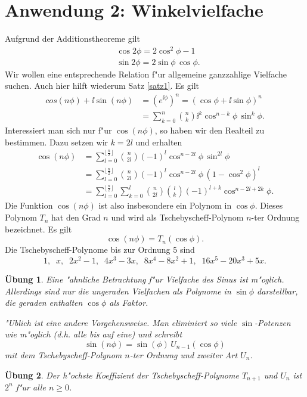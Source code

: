 \documentclass[11pt]{article}
\newtheorem{uebung}{\"{U}bung}
\begin{document}
\section{Anwendung 2: Winkelvielfache}
Aufgrund der Additionstheoreme gilt
\begin{align}
  &\cos 2\phi=2\cos^2\phi-1\\
  &\sin 2\phi=2\sin\phi\,\cos\phi.
\end{align}
Wir wollen eine entsprechende Relation f"ur allgemeine ganzzahlige Vielfache
suchen. Auch hier hilft wiederum Satz \ref{satz1}. Es gilt
\begin{align*}
  cos(n\phi)+\ii\sin(n\phi)
  &=\left(e^{\ii\phi}\right)^n=(\cos\phi+\ii\sin\phi)^n\\
  &=\sum_{k=0}^n\binom{n}{k} \ii^k \cos^{n-k}\phi\,\sin^k\phi.
\end{align*}   
Interessiert man sich nur f"ur $\cos(n\phi)$, so haben wir den Realteil zu
bestimmen. Dazu setzen wir $k=2l$ und erhalten
\begin{align*}
  \cos(n\phi)&=\sum_{l=0}^{\lfloor\frac n2\rfloor}
  \binom{n}{2l}(-1)^l\cos^{n-2l}\phi\,\sin^{2l}\phi\\
  &=\sum_{l=0}^{\lfloor\frac n2\rfloor}
  \binom{n}{2l}(-1)^l\cos^{n-2l}\phi\,(1-\cos^2\phi)^l\\
  &=\sum_{l=0}^{\lfloor\frac n2\rfloor}\sum_{k=0}^l
  \binom{n}{2l}\binom{l}{k}(-1)^{l+k}\cos^{n-2l+2k}\phi.
\end{align*}
Die Funktion $\cos(n\phi)$ ist also insbesondere ein Polynom in
$\cos\phi$. Dieses Polynom $T_n$ hat den Grad $n$ und wird als
Tschebyscheff-Polynom $n$-ter Ordnung bezeichnet. Es gilt
\begin{equation}
  \cos(n\phi)=T_n(\cos\phi).
\end{equation}
Die Tschebyscheff-Polynome bis zur Ordnung 5 sind
\begin{equation}
  1,\;\;x,\;\;2x^2-1,\;\;4x^3-3x,\;\;8x^4-8x^2+1,\;\;16x^5-20x^3+5x.
\end{equation}
\begin{uebung}
  Eine "ahnliche Betrachtung f"ur Vielfache des Sinus ist m"oglich. Allerdings
  sind nur die ungeraden Vielfachen als Polynome in $\sin\phi$ darstellbar, die
  geraden enthalten $\cos\phi$ als Faktor.

  "Ublich ist eine andere Vorgehensweise. Man eliminiert so viele
  $\sin$-Potenzen wie m"oglich (d.h. alle bis auf eine) und schreibt
  \begin{equation}
    \sin(n\phi)=\sin(\phi)\,U_{n-1}(\cos\phi)
  \end{equation}
  mit dem Tschebyscheff-Polynom $n$-ter Ordnung und zweiter Art $U_n$.
\end{uebung}
\begin{uebung}
  Der h"ochste Koeffizient der Tschebyscheff-Polynome $T_{n+1}$ und $U_n$ 
  ist $2^n$ f"ur alle $n\geq0$. 
\end{uebung}
%
\end{document}
